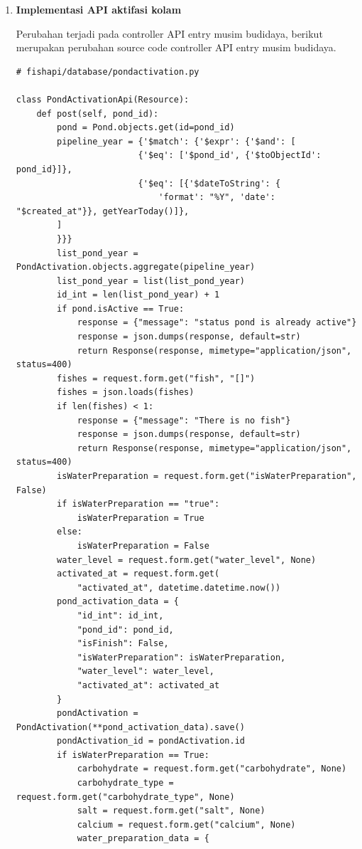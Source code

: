 \begin{enumerate}[1.]
\item \textbf{Implementasi API aktifasi kolam}

Perubahan terjadi pada controller API entry musim budidaya, berikut merupakan perubahan source code controller API entry musim budidaya.

\begin{lstlisting}
# fishapi/database/pondactivation.py

class PondActivationApi(Resource):
    def post(self, pond_id):
        pond = Pond.objects.get(id=pond_id)
        pipeline_year = {'$match': {'$expr': {'$and': [
                        {'$eq': ['$pond_id', {'$toObjectId': pond_id}]},
                        {'$eq': [{'$dateToString': {
                            'format': "%Y", 'date': "$created_at"}}, getYearToday()]},
        ]
        }}}
        list_pond_year = PondActivation.objects.aggregate(pipeline_year)
        list_pond_year = list(list_pond_year)
        id_int = len(list_pond_year) + 1
        if pond.isActive == True:
            response = {"message": "status pond is already active"}
            response = json.dumps(response, default=str)
            return Response(response, mimetype="application/json", status=400)
        fishes = request.form.get("fish", "[]")
        fishes = json.loads(fishes)
        if len(fishes) < 1:
            response = {"message": "There is no fish"}
            response = json.dumps(response, default=str)
            return Response(response, mimetype="application/json", status=400)
        isWaterPreparation = request.form.get("isWaterPreparation", False)
        if isWaterPreparation == "true":
            isWaterPreparation = True
        else:
            isWaterPreparation = False
        water_level = request.form.get("water_level", None)
        activated_at = request.form.get(
            "activated_at", datetime.datetime.now())
        pond_activation_data = {
            "id_int": id_int,
            "pond_id": pond_id,
            "isFinish": False,
            "isWaterPreparation": isWaterPreparation,
            "water_level": water_level,
            "activated_at": activated_at
        }
        pondActivation = PondActivation(**pond_activation_data).save()
        pondActivation_id = pondActivation.id
        if isWaterPreparation == True:
            carbohydrate = request.form.get("carbohydrate", None)
            carbohydrate_type = request.form.get("carbohydrate_type", None)
            salt = request.form.get("salt", None)
            calcium = request.form.get("calcium", None)
            water_preparation_data = {

\end{lstlisting}
\end{enumerate}
